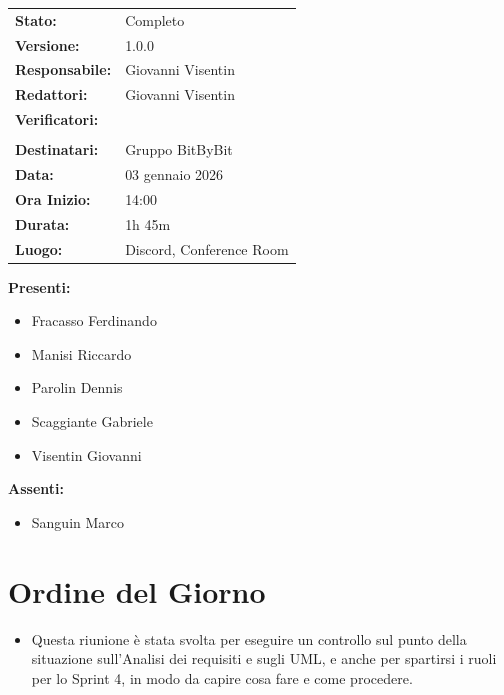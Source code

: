 \documentclass[a4paper,12pt]{article}
\begin{document}
\begin{tcolorbox}
\begin{tabularx}{\textwidth}{@{}l X@{}}
\textbf{Stato:} & Completo \\
\textbf{Versione:} & 1.0.0 \\
\textbf{Responsabile:} & Giovanni Visentin \\
\textbf{Redattori:} &  Giovanni Visentin \\
\textbf{Verificatori:} & 
\begin{tabular}[t]{@{}l@{}}
     Dennis Parolin\\
\end{tabular}\\
\textbf{Destinatari:} & Gruppo BitByBit \\ 
\textbf{Data:} & 03 gennaio 2026 \\
\textbf{Ora Inizio:} & 14:00 \\
\textbf{Durata:} & 1h 45m \\
\textbf{Luogo:} & Discord, Conference Room \\
\end{tabularx}
\end{tcolorbox}

\textbf{Presenti:} 
\begin{itemize}
    \item Fracasso Ferdinando
    \item Manisi Riccardo
    \item Parolin Dennis
    \item Scaggiante Gabriele
    \item Visentin Giovanni 
\end{itemize} 
\textbf{Assenti:} 
\begin{itemize}
    \item Sanguin Marco
\end{itemize}

\vspace*{\fill} %

\clearpage

\clearpage
\tableofcontents
\thispagestyle{empty} %
\clearpage


\section{Ordine del Giorno}
\begin{itemize}
    \item Questa riunione è stata svolta per eseguire un controllo sul punto della situazione sull'Analisi dei requisiti e sugli UML, e anche per spartirsi i ruoli per lo Sprint 4, in modo da capire cosa fare e come procedere.
\end{itemize}
\end{document}
